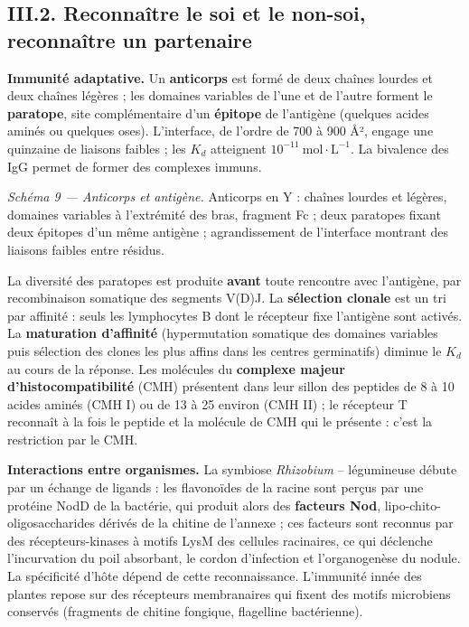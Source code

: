 \documentclass[11pt,a4paper]{article}
\begin{document}
\hypertarget{iii.2.-reconnauxeetre-le-soi-et-le-non-soi-reconnauxeetre-un-partenaire}{%
\subsection{III.2. Reconnaître le soi et le non-soi, reconnaître un partenaire}\label{iii.2.-reconnauxeetre-le-soi-et-le-non-soi-reconnauxeetre-un-partenaire}}

\textbf{Immunité adaptative.} Un \textbf{anticorps} est formé de deux chaînes lourdes et deux chaînes légères ; les domaines variables de l'une et de l'autre forment le \textbf{paratope}, site complémentaire d'un \textbf{épitope} de l'antigène (quelques acides aminés ou quelques oses). L'interface, de l'ordre de 700 à 900 Å², engage une quinzaine de liaisons faibles ; les \(K_d\) atteignent \(10^{-11}\ \mathrm{mol\cdot L^{-1}}\). La bivalence des IgG permet de former des complexes immuns.

\emph{Schéma 9 --- Anticorps et antigène.} Anticorps en Y : chaînes lourdes et légères, domaines variables à l'extrémité des bras, fragment Fc ; deux paratopes fixant deux épitopes d'un même antigène ; agrandissement de l'interface montrant des liaisons faibles entre résidus.

La diversité des paratopes est produite \textbf{avant} toute rencontre avec l'antigène, par recombinaison somatique des segments V(D)J. La \textbf{sélection clonale} est un tri par affinité : seuls les lymphocytes B dont le récepteur fixe l'antigène sont activés. La \textbf{maturation d'affinité} (hypermutation somatique des domaines variables puis sélection des clones les plus affins dans les centres germinatifs) diminue le \(K_d\) au cours de la réponse. Les molécules du \textbf{complexe majeur d'histocompatibilité} (CMH) présentent dans leur sillon des peptides de 8 à 10 acides aminés (CMH I) ou de 13 à 25 environ (CMH II) ; le récepteur T reconnaît à la fois le peptide et la molécule de CMH qui le présente : c'est la restriction par le CMH.

\textbf{Interactions entre organismes.} La symbiose \emph{Rhizobium} -- légumineuse débute par un échange de ligands : les flavonoïdes de la racine sont perçus par une protéine NodD de la bactérie, qui produit alors des \textbf{facteurs Nod}, lipo-\allowbreak{}chito-\allowbreak{}oligosaccharides dérivés de la chitine de l'annexe ; ces facteurs sont reconnus par des récepteurs-kinases à motifs LysM des cellules racinaires, ce qui déclenche l'incurvation du poil absorbant, le cordon d'infection et l'organogenèse du nodule. La spécificité d'hôte dépend de cette reconnaissance. L'immunité innée des plantes repose sur des récepteurs membranaires qui fixent des motifs microbiens conservés (fragments de chitine fongique, flagelline bactérienne).
\end{document}
